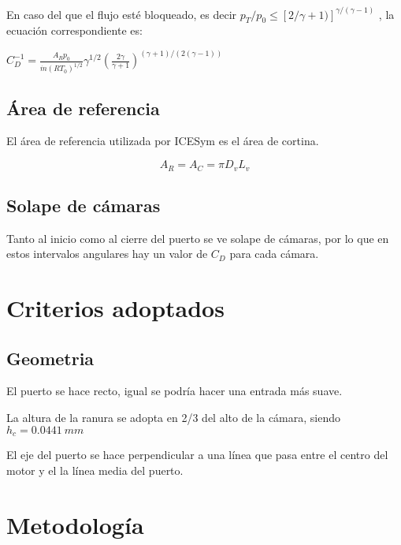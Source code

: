 En caso del que el flujo esté bloqueado, es decir
$p_T/p_0 \le [2/\gamma+1)]^{\gamma/(\gamma - 1)}$
, la ecuación correspondiente es:

\begin{math}
C_D^{-1} =  \frac {A_R p_0} {\dot{m} (R T_0)^{1/2}}
            \gamma^{1/2}
            \left( \frac{2\gamma}{\gamma+1} \right)^{(\gamma+1)/(2(\gamma-1))}
\end{math}

\subsection{Área de referencia}
El área de referencia utilizada por ICESym es el área de cortina.

$$ A_R = A_C = \pi D_v L_v $$

\subsection{Solape de cámaras}
Tanto al inicio como al cierre del puerto se ve solape de cámaras, por lo que
en estos intervalos angulares hay un valor de $C_D$ para cada cámara.

\section{Criterios adoptados}
\subsection{Geometria}
El puerto se hace recto, igual se podría hacer una entrada más suave.

La altura de la ranura se adopta en 2/3 del alto de la cámara, siendo $h_c=0.0441\ mm$

El eje del puerto se hace perpendicular a una línea que pasa entre el centro
del motor y el la línea media del puerto.





\section{Metodología}

